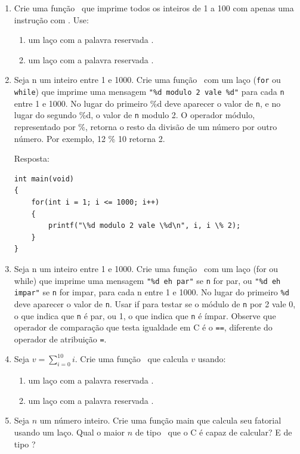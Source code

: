 \begin{enumerate}

  \item Crie uma função \MAIN\ que imprime todos os inteiros de 1 a 100 com apenas uma instrução com \PRINTF. Use:
    \begin{enumerate}
      \item um laço com a palavra reservada \WHILE.
      \item um laço com a palavra reservada \FOR.
    \end{enumerate}

  \item Seja n um inteiro entre 1 e 1000. Crie uma função \MAIN\ com um laço ({\tt for} ou {\tt while}) que imprime uma mensagem \verb|"%d modulo 2 vale %d"| para cada {\tt n} entre 1 e 1000. No lugar do primeiro \%d deve aparecer o valor de {\tt n}, e no lugar do segundo \%d, o valor de {\tt n} modulo 2. O operador módulo, representado por \%, retorna o resto da divisão de um número por outro número. Por exemplo, 12 \% 10 retorna 2.

	Resposta:

\begin{lstlisting}
int main(void)
{
    for(int i = 1; i <= 1000; i++)
    {
        printf("\%d modulo 2 vale \%d\n", i, i \% 2);
    }
}
\end{lstlisting}

  \item Seja n um inteiro entre 1 e 1000. Crie uma função \MAIN\ com um laço (for ou while) que imprime uma mensagem \verb|"%d eh par"| se {\tt n} for par, ou \verb|"%d eh impar"| se {\tt n} for impar, para cada n entre 1 e 1000. No lugar do primeiro \verb|%d| deve aparecer o valor de {\tt n}. Usar if para testar se o módulo de {\tt n} por 2 vale 0, o que indica que {\tt n} é par, ou 1, o que indica que {\tt n} é ímpar. Observe que operador de comparação que testa igualdade em C é o {\tt ==}, diferente do operador de atribuição {\tt =}.

  \item Seja $v = \sum_{i=0}^{10}i$. Crie uma função \MAIN\ que calcula $v$ usando:
    \begin{enumerate}
      \item um laço com a palavra reservada \WHILE.
      \item um laço com a palavra reservada \FOR.
    \end{enumerate}

  \item Seja $n$ um número inteiro. Crie uma função main que calcula seu fatorial usando um laço. Qual o maior $n$ de tipo \INT\ que o C é capaz de calcular? E de tipo \LONGINT?


\end{enumerate}
